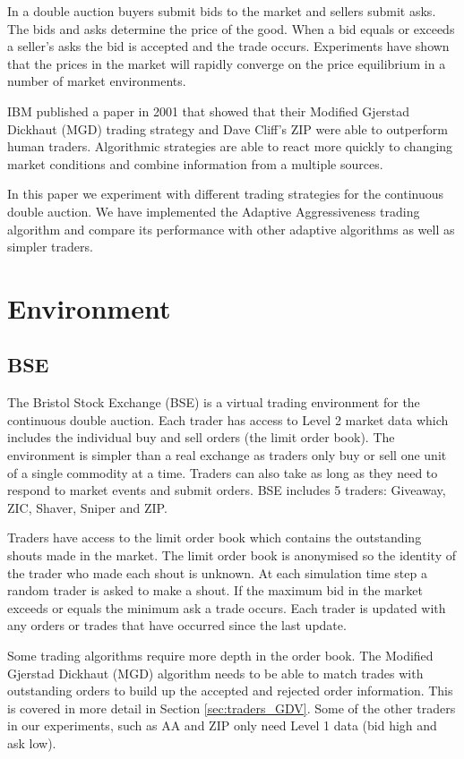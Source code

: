 \documentclass[preprint]{acm_proc_article-sp} %
\begin{document}
In a double auction buyers submit bids to the market and sellers submit asks. The bids and asks determine the price of the good.
When a bid equals or exceeds a seller's asks the bid is accepted and the trade
occurs. Experiments have shown  that the prices in the market will
rapidly converge on the price equilibrium in a number of market
environments\cite{smith_1962}.

IBM published a paper in 2001 that showed that their Modified Gjerstad Dickhaut (MGD) trading strategy and
Dave Cliff's ZIP were able to outperform human traders\cite{ibm_human}.
Algorithmic strategies are able to react more quickly to changing market
conditions and combine information from a multiple sources.

In this paper we experiment with different trading strategies for the
continuous double auction.
We have implemented the Adaptive Aggressiveness\cite{AA_thesis} trading
algorithm and compare its performance with other adaptive algorithms as well
as simpler traders.\\


\section{Environment} \label{sec:environment}
\subsection{BSE} \label{sec:BSE}
The Bristol Stock Exchange (BSE) is a virtual trading environment for the
continuous double auction. Each trader has access to Level 2 market data which
includes the individual buy and sell orders (the limit order book). The
environment is simpler than a real exchange as traders only buy or sell one
unit of a single commodity at a time. Traders can also take as long as they
need to respond to market events and submit orders. BSE includes 5 traders: Giveaway, ZIC, Shaver, Sniper and ZIP.

Traders have access to the limit order book which contains the outstanding
shouts made in the market. The limit order book is anonymised so the identity
of the trader who made each shout is unknown. At each simulation time step a
random trader is asked to make a shout. If the maximum bid in the market
exceeds or equals the minimum ask a trade occurs. Each trader is updated with
any orders or trades that have occurred since the last update.

Some trading algorithms require more depth in the order book. The Modified
Gjerstad Dickhaut (MGD) algorithm needs to be able to match trades with
outstanding orders to build up the accepted and rejected order information.
This is covered in more detail in Section \ref{sec:traders_GDV}. Some of the
other traders in our experiments, such as AA and ZIP only need Level 1 data
(bid high and ask low).
\end{document}
